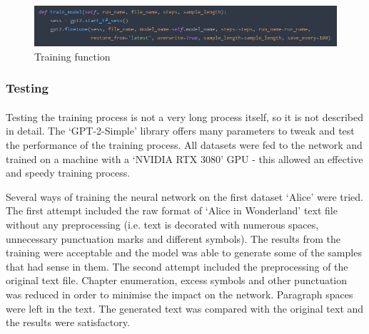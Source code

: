 \documentclass[12pt]{report}
\begin{document}
\begin{figure}[ht]
  \centering
  \includegraphics[width=1\linewidth]{img/train_model_example.png}
  \caption{Training function}
  \label{fig:train_model}
\end{figure}

\clearpage

\subsubsection*{Testing}
\paragraph{}
\label{sec:model_testing}
Testing the training process is not a very long process itself, so it is not described in detail. The `GPT-2-Simple'
library offers many parameters to tweak and test the performance of the training process. All datasets were fed to the
network and trained on a machine with a `NVIDIA RTX 3080' GPU - this allowed an effective and speedy training process.

Several ways of training the neural network on the first dataset `Alice' were tried. The first attempt included
the raw format of `Alice in Wonderland' text file without any preprocessing (i.e. text is decorated with numerous
spaces, unnecessary punctuation marks and different symbols). The results from the training were acceptable and
the model was able to generate some of the samples that had sense in them. The second attempt included the preprocessing
of the original text file. Chapter enumeration, excess symbols and other punctuation was reduced in order to
minimise the impact on the network. Paragraph spaces were left in the text. The generated text was compared with the
original text and the results were satisfactory.
\end{document}
